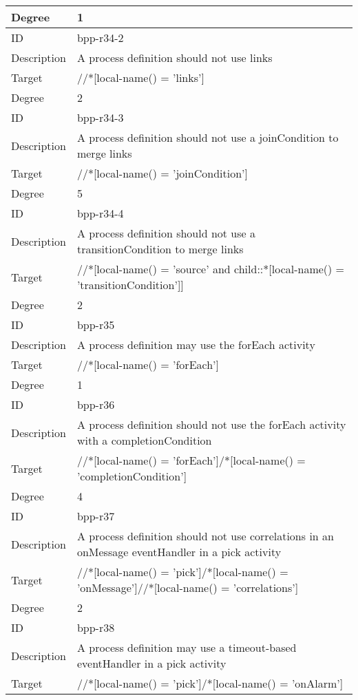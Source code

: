 \begin{center}
\begin{tiny}
\begin{longtable}{p{}|p{}}
\myrowcolour
Degree & 1\\
\midrule
ID & bpp-r34-2\\
\myrowcolour
Description &A process definition should not use links\\
Target & //*[local-name() = 'links']\\
\myrowcolour
Degree & 2\\
\midrule
ID & bpp-r34-3\\
\myrowcolour
Description &A process definition should not use a joinCondition to merge links\\
Target & //*[local-name() = 'joinCondition']\\
\myrowcolour
Degree & 5\\
\midrule
ID & bpp-r34-4\\
\myrowcolour
Description &A process definition should not use a transitionCondition to merge links\\
Target & //*[local-name() = 'source' and child::*[local-name() = 'transitionCondition']]\\
\myrowcolour
Degree & 2\\
\midrule
ID & bpp-r35\\
\myrowcolour
Description &A process definition may use the forEach activity\\
Target & //*[local-name() = 'forEach']\\
\myrowcolour
Degree & 1\\
\midrule
ID & bpp-r36\\
\myrowcolour
Description &A process definition should not use the forEach activity with a completionCondition\\
Target & //*[local-name() = 'forEach']/*[local-name() = 'completionCondition']\\
\myrowcolour
Degree & 4\\
\midrule
ID & bpp-r37\\
\myrowcolour
Description &A process definition should not use correlations in an onMessage eventHandler in a pick activity\\
Target & //*[local-name() = 'pick']/*[local-name() = 'onMessage']//*[local-name() = 'correlations']\\
\myrowcolour
Degree & 2\\
\midrule
ID & bpp-r38\\
\myrowcolour
Description &A process definition may use a timeout-based eventHandler in a pick activity\\
Target & //*[local-name() = 'pick']/*[local-name() = 'onAlarm']\\

\end{longtable}
\end{tiny}
\end{center}
